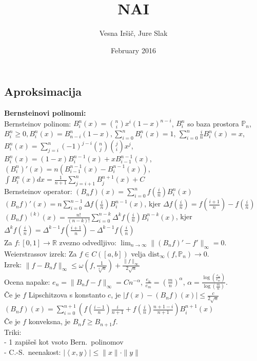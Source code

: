 \documentclass[a4paper,12pt]{article}
\title{NAI}
\author{Vesna Iršič, Jure Slak}
\date{February 2016}
\theoremstyle{definition}
\def\R{\mathbb{R}}
\def\P{\mathbb{P}}
\newcommand{\ls}{\left\langle}
\newcommand{\rs}{\right\rangle}
\begin{document}

\subsection*{Aproksimacija}
\textbf{Bernsteinovi polinomi:} \\
Bernsteinov polinom: $B_i^n(x) = \binom{n}{i} x^i (1-x)^{n-i}$, $B_i^n$ so baza prostora $\P_n$, $B_i^n \geq 0,
B_i^n(x) = B_{n-i}^n(1-x),
\sum_{i=0}^n B_i^n(x) = 1$,
$\sum_{i=0}^n \frac{i}{n} B_i^n(x) = x$,
$B_i^n(x) = \sum_{j=i}^n (-1)^{j-i} \binom{n}{j} \binom{j}{i} x^j$,
$B_i^n(x) = (1-x) B_i^{n-1}(x) + x B_{i-1}^{n-1}(x)$,
$(B_i^n)'(x) = n (B_{i-1}^{n-1}(x) - B_i^{n-1}(x))$,
$\int B_i^n(x) dx = \frac{1}{n+1} \sum_{j = i+1}^n B_j^{n+1}(x) + C$\\
Bernsteinov operator: $(B_nf)(x) = \sum_{i=0}^n f(\frac{i}{n}) B_i^n(x)$\\
$(B_nf)'(x) = n \sum_{i=0}^{n-1} \Delta f(\frac{i}{n}) B_i^{n-1}(x)$, kjer
$\Delta f(\frac{i}{n}) = f(\frac{i+1}{n}) - f(\frac{i}{n})$\\
$(B_nf)^{(k)}(x) = \frac{n!}{(n-k)!} \sum_{i=0}^{n-k} \Delta^kf(\frac{i}{n}) B_i^{n-k}(x)$,
kjer $\Delta^k f(\frac{i}{n}) = \Delta^{k-1} f(\frac{i+1}{n}) - \Delta^{k-1} f(\frac{i}{n})$\\
Za $f \colon [0,1] \to \R$ zvezno odvedljivo: $\lim_{n\to \infty} \|(B_nf)' - f'\|_{\infty} = 0$.\\
Weierstrassov izrek: Za $f \in C([a,b])$ velja $\text{dist}_{\infty} (f, \P_n) \to 0$.\\
Izrek: $\|f - B_n f\|_{\infty} \leq \omega(f, \frac{1}{\sqrt[4]{n}}) + \frac{\|f\|_{\infty}}{2 \sqrt{n}}$\\
Ocena napake: $e_n = \|B_nf - f\|_{\infty} = C n^{-\alpha}$, $\frac{e_n}{e_m} =
(\frac{m}{n})^{\alpha}$, $\alpha =
\frac{\log(\frac{e_n}{e_m})}{\log(\frac{m}{n})}$.\\
Če je $f$ Lipschitzova s konstanto $c$, je $|f(x) - (B_nf)(x)| \leq  \frac{c}{2 \sqrt{n}}$\\
$(B_nf)(x) = \sum_{i=0}^{n+1} (f(\frac{i-1}{n}) \frac{i}{n+1} + f(\frac{i}{n}) \frac{n+1-i}{n+1}) B_i^{n+1}(x)$\\
Če je $f$ konveksna, je $B_nf \geq B_{n+1}f$.\\
Triki:\\
- 1 zapišeš kot vsoto Bern.\ polinomov\\
- C.-S.\ neenakost: $|\ls x,y\rs| \leq \|x\| \cdot \|y\|$
\end{document}

